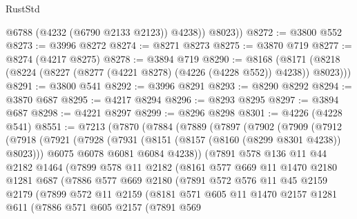 \begin{lexlean}{RustStd}
\begin{coremodule}
            @6788
            (@4232 (@6790 @2133 @2123))
            @4238))
        @8023))
@8272 := @3800 @552
@8273 := @3996 @8272
@8274 := @8271 @8273
@8275 := @3870 @719
@8277 := @8274 (@4217 @8275)
@8278 := @3894 @719
@8290 := @8168
    (@8171 (@8218 (@8224 (@8227 (@8277 (@4221 @8278) (@4226 (@4228 @552)) @4238)) @8023)))
@8291 := @3800 @541
@8292 := @3996 @8291
@8293 := @8290 @8292
@8294 := @3870 @687
@8295 := @4217 @8294
@8296 := @8293 @8295
@8297 := @3894 @687
@8298 := @4221 @8297
@8299 := @8296 @8298
@8301 := @4226 (@4228 @541)
@8551 := @7213
    (@7870
      (@7884
        (@7889
          (@7897
            (@7902
              (@7909
                (@7912
                  (@7918
                    (@7921
                      (@7928
                        (@7931 (@8151 (@8157 (@8160 (@8299 @8301 @4238)) @8023)))
                        @6075
                        @6078
                        @6081
                        @6084
                        @4238))
                    (@7891
                      @578
                      @136
                      @11
                      @44
                      @2182
                      @1464
                      (@7899
                        @578
                        @11
                        @2182
                        (@8161
                          @577
                          @669
                          @11
                          @1470
                          @2180
                          @1281
                          @687
                          (@7886
                            @577
                            @669
                            @2180
                            (@7891
                              @572
                              @576
                              @11
                              @45
                              @2159
                              @2179
                              (@7899
                                @572
                                @11
                                @2159
                                (@8181
                                  @571
                                  @605
                                  @11
                                  @1470
                                  @2157
                                  @1281
                                  @611
                                  (@7886
                                    @571
                                    @605
                                    @2157
                                    (@7891
                                      @569

\end{coremodule}
\end{lexlean}
